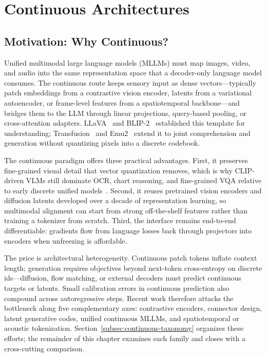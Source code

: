 
\section{Continuous Architectures}
\label{sec:continuous}

\subsection{Motivation: Why Continuous?}
\label{subsec:continuous-motivation}

Unified multimodal large language models (MLLMs) must map images, video, and audio into the same representation space that a decoder-only language model consumes. The continuous route keeps sensory input as dense vectors---typically patch embeddings from a contrastive vision encoder, latents from a variational autoencoder, or frame-level features from a spatiotemporal backbone---and bridges them to the LLM through linear projections, query-based pooling, or cross-attention adapters. LLaVA~\cite{liu2023llava} and BLIP-2~\cite{li2023blip2} established this template for understanding; Transfusion~\cite{zhou2024transfusion} and Emu2~\cite{sun2024emu2} extend it to joint comprehension and generation without quantizing pixels into a discrete codebook.

The continuous paradigm offers three practical advantages. First, it preserves fine-grained visual detail that vector quantization removes, which is why CLIP-driven VLMs still dominate OCR, chart reasoning, and fine-grained VQA relative to early discrete unified models~\cite{team2024chameleon,lin2025toklip}. Second, it reuses pretrained vision encoders and diffusion latents developed over a decade of representation learning, so multimodal alignment can start from strong off-the-shelf features rather than training a tokenizer from scratch. Third, the interface remains end-to-end differentiable: gradients flow from language losses back through projectors into encoders when unfreezing is affordable.

The price is architectural heterogeneity. Continuous patch tokens inflate context length; generation requires objectives beyond next-token cross-entropy on discrete ids---diffusion, flow matching, or external decoders must predict continuous targets or latents. Small calibration errors in continuous prediction also compound across autoregressive steps. Recent work therefore attacks the bottleneck along five complementary axes: contrastive encoders, connector design, latent generative codes, unified continuous MLLMs, and spatiotemporal or acoustic tokenization. Section~\ref{subsec:continuous-taxonomy} organizes these efforts; the remainder of this chapter examines each family and closes with a cross-cutting comparison.

